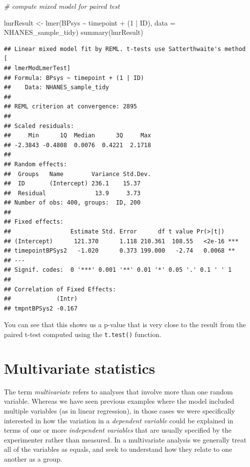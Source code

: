 \documentclass[
  12pt,
]{book}
\newenvironment{Shaded}{\begin{snugshade}}{\end{snugshade}}
\newcommand{\AttributeTok}[1]{\textcolor[rgb]{0.77,0.63,0.00}{#1}}
\newcommand{\CommentTok}[1]{\textcolor[rgb]{0.56,0.35,0.01}{\textit{#1}}}
\newcommand{\DecValTok}[1]{\textcolor[rgb]{0.00,0.00,0.81}{#1}}
\newcommand{\FunctionTok}[1]{\textcolor[rgb]{0.00,0.00,0.00}{#1}}
\newcommand{\NormalTok}[1]{#1}
\newcommand{\OtherTok}[1]{\textcolor[rgb]{0.56,0.35,0.01}{#1}}
\newcommand{\SpecialCharTok}[1]{\textcolor[rgb]{0.00,0.00,0.00}{#1}}
\begin{document}
\begin{Shaded}
\begin{Highlighting}[]
\CommentTok{\# compute mixed model for paired test}

\NormalTok{lmrResult }\OtherTok{\textless{}{-}} \FunctionTok{lmer}\NormalTok{(BPsys }\SpecialCharTok{\textasciitilde{}}\NormalTok{ timepoint }\SpecialCharTok{+}\NormalTok{ (}\DecValTok{1} \SpecialCharTok{|}\NormalTok{ ID), }
                  \AttributeTok{data =}\NormalTok{ NHANES\_sample\_tidy)}
\FunctionTok{summary}\NormalTok{(lmrResult)}
\end{Highlighting}
\end{Shaded}

\begin{verbatim}
## Linear mixed model fit by REML. t-tests use Satterthwaite's method [
## lmerModLmerTest]
## Formula: BPsys ~ timepoint + (1 | ID)
##    Data: NHANES_sample_tidy
## 
## REML criterion at convergence: 2895
## 
## Scaled residuals: 
##     Min      1Q  Median      3Q     Max 
## -2.3843 -0.4808  0.0076  0.4221  2.1718 
## 
## Random effects:
##  Groups   Name        Variance Std.Dev.
##  ID       (Intercept) 236.1    15.37   
##  Residual              13.9     3.73   
## Number of obs: 400, groups:  ID, 200
## 
## Fixed effects:
##                 Estimate Std. Error      df t value Pr(>|t|)    
## (Intercept)      121.370      1.118 210.361  108.55   <2e-16 ***
## timepointBPSys2   -1.020      0.373 199.000   -2.74   0.0068 ** 
## ---
## Signif. codes:  0 '***' 0.001 '**' 0.01 '*' 0.05 '.' 0.1 ' ' 1
## 
## Correlation of Fixed Effects:
##             (Intr)
## tmpntBPSys2 -0.167
\end{verbatim}

You can see that this shows us a p-value that is very close to the result from the paired t-test computed using the \texttt{t.test()} function.

\hypertarget{multivariate}{%
\chapter{Multivariate statistics}\label{multivariate}}

The term \emph{multivariate} refers to analyses that involve more than one random variable. Whereas we have seen previous examples where the model included multiple variables (as in linear regression), in those cases we were specifically interested in how the variation in a \emph{dependent variable} could be explained in terms of one or more \emph{independent variables} that are usually specified by the experimenter rather than measured. In a multivariate analysis we generally treat all of the variables as equals, and seek to understand how they relate to one another as a group.
\end{document}
